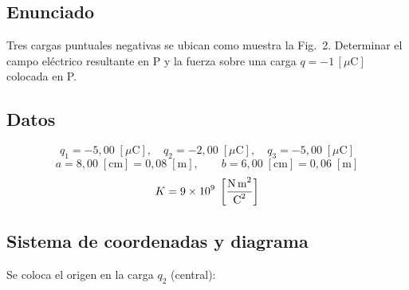 \documentclass[12pt,letterpaper]{article}
\begin{document}
\subsection*{Enunciado}

Tres cargas puntuales negativas se ubican como muestra la Fig.\ 2.
Determinar el campo el\'ectrico resultante en P y la fuerza sobre una
carga $q = -1\,[\mu\text{C}]$ colocada en P.

\subsection*{Datos}

\[
    q_1 = -5{,}00\;[\mu\text{C}],\quad
    q_2 = -2{,}00\;[\mu\text{C}],\quad
    q_3 = -5{,}00\;[\mu\text{C}]
\]
\[
    a = 8{,}00\;[\text{cm}] = 0{,}08\;[\text{m}], \qquad
    b = 6{,}00\;[\text{cm}] = 0{,}06\;[\text{m}]
\]
\[
    K = 9\times10^9\;\left[\frac{\text{N\,m}^2}{\text{C}^2}\right]
\]

\subsection*{Sistema de coordenadas y diagrama}

Se coloca el origen en la carga $q_2$ (central):
\end{document}
